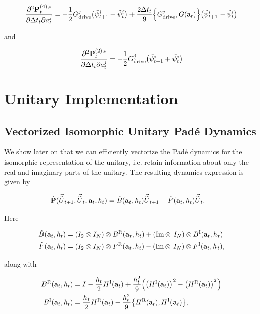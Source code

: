 \documentclass{article}
\newcommand{\isopsi}{\tilde \psi}
\newcommand{\isovecU}{\vec{\widetilde{U}}}
\newcommand{\HI}{H^{\text{I}}}
\newcommand{\HR}{H^{\text{R}}}
\newcommand{\BR}{B^{\text{R}}}
\newcommand{\BI}{B^{\text{I}}}
\newcommand{\FR}{F^{\text{R}}}
\newcommand{\FI}{F^{\text{I}}}
\begin{document}
\begin{equation}
  \pdv{\vb{P}_t^{(4),i}}{\Delta t_t}{a^j_t} 
    = -\frac{1}{2} G^j_{\text{drive}} \qty(\isopsi^i_{t+1} + \isopsi^i_{t}) 
    + \frac{2 \Delta t_t}{9} \qty{G^j_{\text{drive}}, G(\vb{a}_t)}\qty(\isopsi^i_{t+1} - \isopsi^i_{t})
\end{equation}

and


\begin{equation}
  \pdv{\vb{P}_t^{(2),i}}{\Delta t_t}{a^j_t} 
    = -\frac{1}{2} G^j_{\text{drive}} \qty(\isopsi^i_{t+1} + \isopsi^i_{t}) 
\end{equation}

\newpage

\section{Unitary Implementation}

\subsection{Vectorized Isomorphic Unitary Pad\'e Dynamics}

We show later on that we can efficiently vectorize the Pad\'e dynamics for the isomorphic representation of the unitary, i.e. retain information about only the real and imaginary parts of the unitary.  The resulting dynamics expression is given by

\begin{align*}
  \hat{\vb{P}}(\isovecU_{t+1}, \isovecU_t, \vb{a}_t, h_t) 
  &= \hat B(\vb{a}_t, h_t) \isovecU_{t+1} - \hat F(\vb{a}_t, h_t) \isovecU_{t}.
\end{align*}

\noindent
Here 

\begin{align*}
  \hat B(\vb{a}_t, h_t) &= \qty(I_2 \otimes I_N) \otimes \BR(\vb{a}_t, h_t) + (\Im \otimes \ I_N) \otimes \BI(\vb{a}_t, h_t) \\
  \hat F(\vb{a}_t, h_t) &= \qty(I_2 \otimes I_N) \otimes \FR(\vb{a}_t, h_t) - (\Im \otimes \ I_N) \otimes \FI(\vb{a}_t, h_t), 
\end{align*}

\noindent
along with

\begin{align*}
  \BR(\vb{a}_t, h_t) &= I - \frac{h_t}{2} \HI(\vb{a}_t) + \frac{h_t^2}{9}\qty(\qty(\HI(\vb{a}_t))^2 - \qty(\HR(\vb{a}_t))^2) \\
  \BI(\vb{a}_t, h_t) &= \frac{h_t}{2} \HR(\vb{a}_t) - \frac{h_t^2}{9}\qty{\HR(\vb{a}_t),\HI(\vb{a}_t)},
\end{align*}
\end{document}
